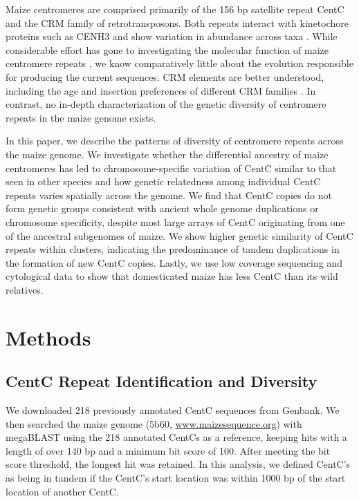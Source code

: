 Maize centromeres are comprised primarily of the 156 bp satellite repeat CentC and the CRM family of retrotransposons.
Both repeats interact with kinetochore proteins such as CENH3 \citep{Wolfgruber2009, Zhong2002} and show variation in abundance across taxa \citep{Albert2010}.
While considerable effort has gone to investigating the molecular function of maize centromere repeats \citep{Ananiev1998B, Nagaki2003, Wolfgruber2009}, we know comparatively little about the evolution responsible for producing the current sequences. 
CRM elements are better understood, including the age and insertion preferences of different CRM families \citep{Wolfgruber2009, Sharma2008}.
In contrast, no in-depth characterization of the genetic diversity of centromere repeats in the maize genome exists.  

In this paper, we describe the patterns of diversity of centromere repeats across the maize genome.  
We investigate whether the differential ancestry of maize centromeres \citep{Wang2012} has led to chromosome-specific variation of CentC similar to that seen in other species \citep{Kawabe2005, hall2005differential, macas2010global} and how genetic relatedness among individual CentC repeats varies spatially across the genome.
We find that CentC copies do not form genetic groups consistent with ancient whole genome duplications or chromosome specificity, despite most large arrays of CentC originating from  one of the ancestral subgenomes of maize.
We show higher genetic similarity of CentC repeats within clusters, indicating the predominance of tandem duplications in the formation of new CentC copies.
Lastly, we use low coverage sequencing and cytological data to show that domesticated maize has less CentC than its wild relatives.

\section*{Methods} 
\label{methods}

\subsection*{CentC Repeat Identification and Diversity}

We downloaded 218 previously annotated CentC sequences \citep{Ananiev1998B, Nagaki2003} from Genbank.  
We then searched the maize genome (5b60, \url{www.maizesequence.org}) with megaBLAST \citep{McGinnis2004} using the 218 annotated CentCs as a reference, keeping hits with a length of over 140 bp and a minimum bit score of 100.
After meeting the bit score threshold, the longest hit was retained.
In this analysis, we defined CentC’s as being in tandem if the CentC’s start location was within 1000 bp of the start location of another CentC.
	
